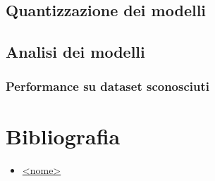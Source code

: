 \documentclass[12pt,a4paper,openright,twoside]{book}
\begin{document}
\section{Quantizzazione dei modelli}
\section{Analisi dei modelli}
\subsection{Performance su dataset sconosciuti}



\chapter{Bibliografia}
\begin{itemize}
    \item \href{<sito>}{<nome>}
\end{itemize}
\end{document}
